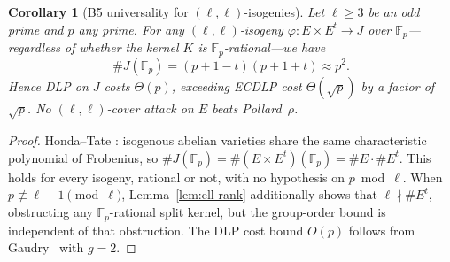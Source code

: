 \documentclass[11pt,a4paper]{article}
\newtheorem{corollary}[theorem]{Corollary}
\theoremstyle{definition}
\newcommand{\FF}{\mathbb{F}}
\begin{document}
\begin{corollary}[B5 universality for $(\ell,\ell)$-isogenies]\label{cor:b5-univ}
Let $\ell \geq 3$ be an odd prime and $p$ any prime.
For \emph{any} $(\ell,\ell)$-isogeny $\varphi\colon E \times E^t \to J$
over $\FF_p$---regardless of whether the kernel $K$ is
$\FF_p$-rational---we have
\[
  \#J(\FF_p) = (p+1-t)(p+1+t) \approx p^2.
\]
Hence DLP on $J$ costs $\Theta(p)$, exceeding ECDLP cost
$\Theta(\sqrt{p})$ by a factor of $\sqrt{p}$.  No $(\ell,\ell)$-cover
attack on $E$ beats Pollard~$\rho$.
\end{corollary}

\begin{proof}
Honda--Tate \cite{tate1966}: isogenous abelian varieties share the
same characteristic polynomial of Frobenius, so
$\#J(\FF_p) = \#(E \times E^t)(\FF_p) = \#E \cdot \#E^t$.
This holds for every isogeny, rational or not, with no hypothesis on
$p \bmod \ell$.  When $p \not\equiv \ell{-}1 \pmod\ell$,
Lemma~\ref{lem:ell-rank} additionally shows that
$\ell \nmid \#E^t$, obstructing any $\FF_p$-rational split kernel,
but the group-order bound is independent of that obstruction.
The DLP cost bound $O(p)$ follows from
Gaudry~\cite{gaudry2000} with $g = 2$.
\end{proof}
\end{document}
